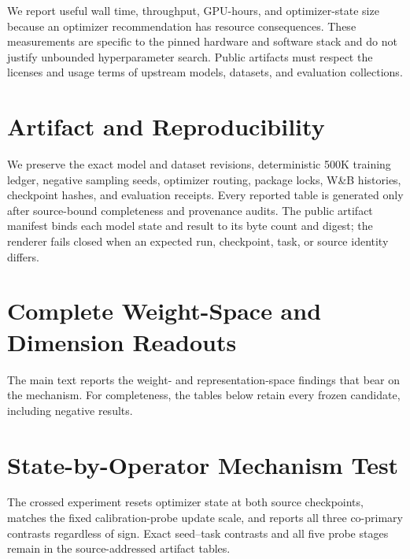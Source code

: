 \documentclass[11pt]{article}
\begin{document}
We report useful wall time, throughput, GPU-hours, and optimizer-state size because an optimizer
recommendation has resource consequences. These measurements are specific to the pinned hardware
and software stack and do not justify unbounded hyperparameter search. Public artifacts must respect
the licenses and usage terms of upstream models, datasets, and evaluation collections.



\appendix

\section{Artifact and Reproducibility}

We preserve the exact model and dataset revisions, deterministic 500K training ledger, negative
sampling seeds, optimizer routing, package locks, W\&B histories, checkpoint hashes, and evaluation
receipts. Every reported table is generated only after source-bound completeness and provenance
audits. The public artifact manifest binds each model state and result to its byte count and digest;
the renderer fails closed when an expected run, checkpoint, task, or source identity differs.

\section{Complete Weight-Space and Dimension Readouts}

The main text reports the weight- and representation-space findings that bear on the mechanism.
For completeness, the tables below retain every frozen candidate, including negative results.

\CorrectedGeometryBridgeTable

\DimensionUtilizationAppendixTable

\section{State-by-Operator Mechanism Test}

The crossed experiment resets optimizer state at both source checkpoints, matches the fixed
calibration-probe update scale, and reports all three co-primary contrasts regardless of sign.
Exact seed--task contrasts and all five probe stages remain in the source-addressed artifact tables.

\StateOperatorAppendixTable

\FloatBarrier
\end{document}
